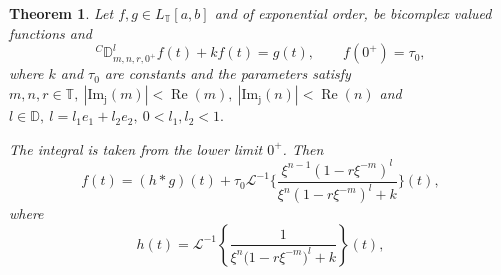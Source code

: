 \documentclass[10pt,a4paper]{amsart}
\newtheorem{theorem}{Theorem}
\begin{document}
\begin{theorem}\label{th:cauchy-nonhomo}
    Let $f,g\in  L_{\mathbb{T}}[a, b] $ and of exponential order, be bicomplex valued functions and
\begin{equation}\label{cauchy1}
{}^{C}\mathbb{D}^{l}_{m,n,r,0^+} f(t)+kf(t) = g(t), 
\qquad f(0^+) = \tau_0,
\end{equation}
where $k$ and $\tau_0$ are constants and the parameters satisfy 
$m,n,r \in \mathbb{T},~|\operatorname{Im_j}(m)|<\operatorname{Re}(m),~|\operatorname{Im_j}(n)|<\operatorname{Re}(n)$ and $l\in \mathbb{D},~l=l_1e_1+l_2e_2, ~0<l_1,l_2<1.$


The integral is taken from the lower limit $0^+$. Then
\begin{equation}
f(t)= (h *g)(t)+\tau_{0}\mathcal{L}^{-1}\Big\{\frac{\xi^{n-1}(1 - r \xi^{-m})^{l}}{\xi^{n}(1 - r \xi^{-m})^{l} + k}\Big\}(t),
\end{equation}
where 
\[
h(t) = \mathcal{L}^{-1}\left\{\frac{1}{\xi^{n}\big(1 - r\xi^{-m}\big)^{l} + k}\right\}(t),\]

\end{theorem}	
\end{document}
